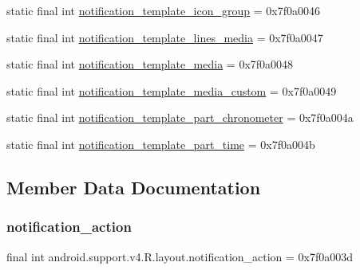 \begin{DoxyCompactItemize}
\item 
static final int \mbox{\hyperlink{classandroid_1_1support_1_1v4_1_1R_1_1layout_adb60bfc7580cc8b8c0a2c836af85cf2e}{notification\+\_\+template\+\_\+icon\+\_\+group}} = 0x7f0a0046
\item 
static final int \mbox{\hyperlink{classandroid_1_1support_1_1v4_1_1R_1_1layout_ab9cb748d281e13c924f1ab4bca00b5d2}{notification\+\_\+template\+\_\+lines\+\_\+media}} = 0x7f0a0047
\item 
static final int \mbox{\hyperlink{classandroid_1_1support_1_1v4_1_1R_1_1layout_a5043b85625c735625170c86528159787}{notification\+\_\+template\+\_\+media}} = 0x7f0a0048
\item 
static final int \mbox{\hyperlink{classandroid_1_1support_1_1v4_1_1R_1_1layout_ae87875e57b9c4f61398ff57329b12161}{notification\+\_\+template\+\_\+media\+\_\+custom}} = 0x7f0a0049
\item 
static final int \mbox{\hyperlink{classandroid_1_1support_1_1v4_1_1R_1_1layout_a15acaf706c5dcf6b2891b13c721f749d}{notification\+\_\+template\+\_\+part\+\_\+chronometer}} = 0x7f0a004a
\item 
static final int \mbox{\hyperlink{classandroid_1_1support_1_1v4_1_1R_1_1layout_a9fb910fd134e67244f19fc9e38e6ba2c}{notification\+\_\+template\+\_\+part\+\_\+time}} = 0x7f0a004b
\end{DoxyCompactItemize}


\subsection{Member Data Documentation}
\mbox{\label{classandroid_1_1support_1_1v4_1_1R_1_1layout_ac1411f1001043a2b326b906b8ff45fea}} 
\subsubsection{\texorpdfstring{notification\+\_\+action}{notification\_action}}
{\footnotesize\ttfamily final int android.\+support.\+v4.\+R.\+layout.\+notification\+\_\+action = 0x7f0a003d\hspace{0.3cm}{\ttfamily [static]}}

\mbox{\label{classandroid_1_1support_1_1v4_1_1R_1_1layout_acb294013b8cd2a08ae0dffd96c702fdb}} 
